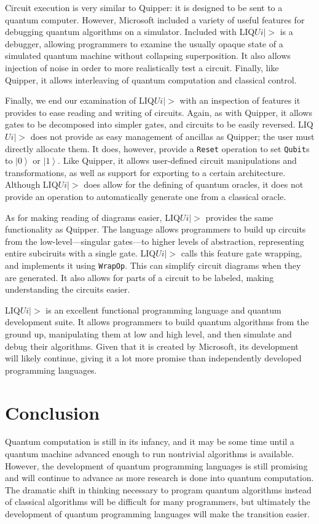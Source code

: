 \documentclass[]{article}
\newcommand{\ket}[1]{\left|#1\right\rangle}
\begin{document}
Circuit execution is very similar to Quipper: it is designed to be sent to a quantum computer. However, Microsoft included a variety of useful features for debugging quantum algorithms on a simulator. Included with LIQ$Ui|>$ is a debugger, allowing programmers to examine the usually opaque state of a simulated quantum machine without collapsing superposition. It also allows injection of noise in order to more realistically test a circuit. Finally, like Quipper, it allows interleaving of quantum computation and classical control.

Finally, we end our examination of LIQ$Ui|>$ with an inspection of features it provides to ease reading and writing of circuits. Again, as with Quipper, it allows gates to be decomposed into simpler gates, and circuits to be easily reversed. LIQ$Ui|>$ does not provide as easy management of ancillas as Quipper; the user must directly allocate them. It does, however, provide a \texttt{Reset} operation to set \texttt{Qubit}s to $\ket{0}$ or $\ket{1}$. Like Quipper, it allows user-defined circuit manipulations and transformations, as well as support for exporting to a certain architecture. Although LIQ$Ui|>$ does allow for the defining of quantum oracles, it does not provide an operation to automatically generate one from a classical oracle.

As for making reading of diagrams easier, LIQ$Ui|>$ provides the same functionality as Quipper. The language allows programmers to build up circuits from the low-level---singular gates---to higher levels of abstraction, representing entire subciruits with a single gate. LIQ$Ui|>$ calls this feature gate wrapping, and implements it using \texttt{WrapOp}. This can simplify circuit diagrams when they are generated. It also allows for parts of a circuit to be labeled, making understanding the circuits easier.

LIQ$Ui|>$ is an excellent functional programming language and quantum development suite. It allows programmers to build quantum algorithms from the ground up, manipulating them at low and high level, and then simulate and debug their algorithms. Given that it is created by Microsoft, its development will likely continue, giving it a lot more promise than independently developed programming languages. \cite{liquid1}

\section{Conclusion}
Quantum computation is still in its infancy, and it may be some time until a quantum machine advanced enough to run nontrivial algorithms is available. However, the development of quantum programming languages is still promising and will continue to advance as more research is done into quantum computation. The dramatic shift in thinking necessary to program quantum algorithms instead of classical algorithms will be difficult for many programmers, but ultimately the development of quantum programming languages will make the transition easier.
\end{document}
